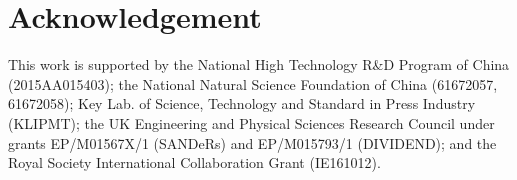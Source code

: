 \section*{Acknowledgement}
This work is supported by the National High Technology R\&D Program of China (2015AA015403); 
the National Natural Science Foundation of China (61672057, 61672058);
Key Lab. of Science, Technology and Standard in Press Industry (KLIPMT);
the UK Engineering and Physical Sciences Research Council under
grants EP/M01567X/1 (SANDeRs) and EP/M015793/1 (DIVIDEND);
and the Royal Society International Collaboration Grant (IE161012).